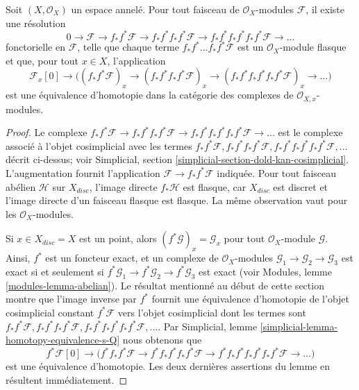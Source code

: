 \begin{lemma}

\label{lemma-godement-resolution}
Soit $(X, \mathcal{O}_X)$ un espace annelé. Pour tout faisceau de $\mathcal{O}_X$-modules $\mathcal{F}$, il existe une résolution $$
0 \to
\mathcal{F} \to
f_*f^*\mathcal{F} \to
f_*f^*f_*f^*\mathcal{F} \to
f_*f^*f_*f^*f_*f^*\mathcal{F} \to \ldots
$$ fonctorielle en $\mathcal{F}$, telle que chaque terme $f_*f^* \ldots f_*f^*\mathcal{F}$ est un $\mathcal{O}_X$-module flasque et que, pour tout $x \in X$, l'application $$
\mathcal{F}_x[0] \to \Big(
(f_*f^*\mathcal{F})_x \to
(f_*f^*f_*f^*\mathcal{F})_x \to
(f_*f^*f_*f^*f_*f^*\mathcal{F})_x \to \ldots
\Big)
$$ est une équivalence d'homotopie dans la catégorie des complexes de $\mathcal{O}_{X, x}$-modules.
\end{lemma}

\begin{proof}

Le complexe $f_*f^*\mathcal{F} \to  f_*f^*f_*f^*\mathcal{F} \to
f_*f^*f_*f^*f_*f^*\mathcal{F} \to \ldots$ est le complexe associé à l'objet cosimplicial avec les termes
$f_*f^*\mathcal{F}, f_*f^*f_*f^*\mathcal{F},
f_*f^*f_*f^*f_*f^*\mathcal{F}, \ldots$ décrit ci-dessus; voir Simplicial, section \ref{simplicial-section-dold-kan-cosimplicial}. L'augmentation fournit l'application $\mathcal{F} \to f_*f^*\mathcal{F}$
indiquée. Pour tout faisceau abélien $\mathcal{H}$ sur $X_{disc}$, l'image directe $f_*\mathcal{H}$ est flasque, car $X_{disc}$
est discret et l'image directe d'un faisceau flasque est flasque. La même observation vaut pour les $\mathcal{O}_X$-modules.

\medskip\noindent

Si $x \in X_{disc} = X$ est un point, alors $(f^*\mathcal{G})_x = \mathcal{G}_x$
pour tout $\mathcal{O}_X$-module $\mathcal{G}$. Ainsi, $f^*$ est un foncteur exact, et un complexe de $\mathcal{O}_X$-modules
$\mathcal{G}_1 \to \mathcal{G}_2 \to \mathcal{G}_3$
est exact si et seulement si
$f^*\mathcal{G}_1 \to f^*\mathcal{G}_2 \to f^*\mathcal{G}_3$
est exact (voir Modules, lemme \ref{modules-lemma-abelian}). Le résultat mentionné au début de cette section montre que l'image inverse par $f^*$ fournit une équivalence d'homotopie de l'objet cosimplicial constant $f^*\mathcal{F}$ vers l'objet cosimplicial dont les termes sont
$f_*f^*\mathcal{F}, f_*f^*f_*f^*\mathcal{F},
f_*f^*f_*f^*f_*f^*\mathcal{F}, \ldots$. Par Simplicial, lemme \ref{simplicial-lemma-homotopy-equivalence-s-Q}
nous obtenons que
$$
f^*\mathcal{F}[0] \to \Big(
f^*f_*f^*\mathcal{F} \to
f^*f_*f^*f_*f^*\mathcal{F} \to
f^*f_*f^*f_*f^*f_*f^*\mathcal{F} \to \ldots
\Big)
$$
est une équivalence d'homotopie. Les deux dernières assertions du lemme en résultent immédiatement.

\end{proof}

